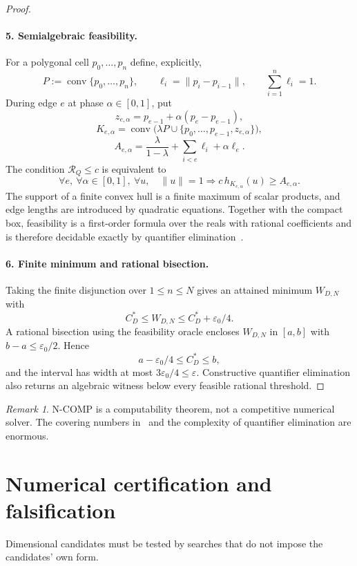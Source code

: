 \documentclass[10pt,a4paper]{article}
\newcommand{\conv}{\operatorname{conv}}
\newcommand{\cstar}{C^{*}}
\theoremstyle{plain}
\theoremstyle{definition}
\theoremstyle{remark}
\newtheorem{remark}[theorem]{Remark}
\begin{document}
\begin{proof}
\paragraph{5. Semialgebraic feasibility.}
For a polygonal cell $p_0,\ldots,p_n$ define, explicitly,
\[
  P:=\conv\{p_0,\ldots,p_n\},
  \qquad
  \ell_i=\|p_i-p_{i-1}\|,
  \qquad
  \sum_{i=1}^n\ell_i=1.
\]
During edge $e$ at phase $\alpha\in[0,1]$, put
\[
  z_{e,\alpha}=p_{e-1}+\alpha(p_e-p_{e-1}),
\]
\[
  K_{e,\alpha}
  =\conv\bigl(\lambda P\cup\{p_0,\ldots,p_{e-1},z_{e,\alpha}\}\bigr),
\]
\[
  A_{e,\alpha}
  =\frac{\lambda}{1-\lambda}
   +\sum_{i<e}\ell_i+\alpha\ell_e.
\]
The condition $\mathcal R_Q\le c$ is equivalent to
\[
  \forall e,\ \forall\alpha\in[0,1],\ \forall u,
  \quad \|u\|=1
  \Longrightarrow
  c\,h_{K_{e,\alpha}}(u)\ge A_{e,\alpha}.
\]
The support of a finite convex hull is a finite maximum of scalar products, and edge lengths are introduced by quadratic equations. Together with the compact box, feasibility is a first-order formula over the reals with rational coefficients and is therefore decidable exactly by quantifier elimination~\cite{basu-pollack-roy}.

\paragraph{6. Finite minimum and rational bisection.}
Taking the finite disjunction over $1\le n\le N$ gives an attained minimum $W_{D,N}$ with
\[
  \cstar_D\le W_{D,N}\le\cstar_D+\varepsilon_0/4.
\]
A rational bisection using the feasibility oracle encloses $W_{D,N}$ in $[a,b]$ with $b-a\le\varepsilon_0/2$. Hence
\[
  a-\varepsilon_0/4\le\cstar_D\le b,
\]
and the interval has width at most $3\varepsilon_0/4\le\varepsilon$. Constructive quantifier elimination also returns an algebraic witness below every feasible rational threshold.
\end{proof}

\begin{remark}
N-COMP is a computability theorem, not a competitive numerical solver. The covering numbers in~\cite[Theorem~5.1]{koch-cell} and the complexity of quantifier elimination are enormous.
\end{remark}

\section{Numerical certification and falsification}

Dimensional candidates must be tested by searches that do not impose the candidates' own form.
\end{document}
